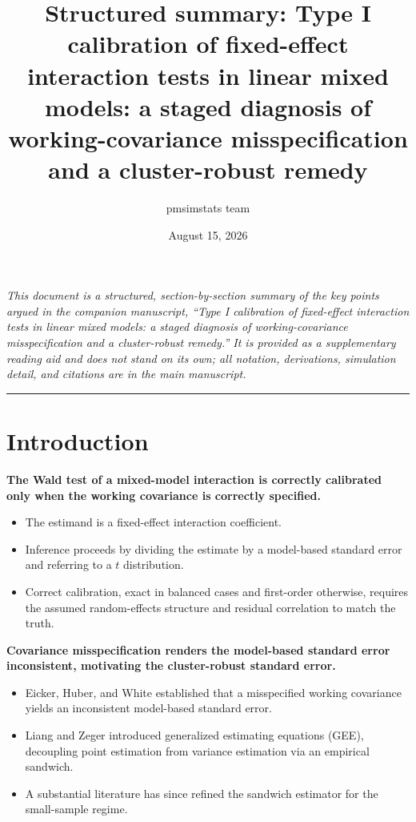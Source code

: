 \documentclass[
  11pt,
]{article}
\title{Structured summary: Type I calibration of fixed-effect interaction tests in linear mixed models: a staged diagnosis of working-covariance misspecification and a cluster-robust remedy}
\author{pmsimstats team}
\date{August 15, 2026}
\begin{document}
\maketitle

{
\setcounter{tocdepth}{2}
\tableofcontents
}
\emph{This document is a structured, section-by-section summary of the key points argued in the companion manuscript, ``Type I calibration of fixed-effect interaction tests in linear mixed models: a staged diagnosis of working-covariance misspecification and a cluster-robust remedy.'' It is provided as a supplementary reading aid and does not stand on its own; all notation, derivations, simulation detail, and citations are in the main manuscript.}

\bigskip\noindent

\rule{\textwidth}{0.4pt}\bigskip

\section{Introduction}\label{introduction}

\textbf{The Wald test of a mixed-model interaction is correctly calibrated only when the working covariance is correctly specified.}

\begin{itemize}\setlength{\itemsep}{2pt}\setlength{\parskip}{0pt}
\item The estimand is a fixed-effect interaction coefficient.
\item Inference proceeds by dividing the estimate by a model-based standard error and referring to a $t$ distribution.
\item Correct calibration, exact in balanced cases and first-order otherwise, requires the assumed random-effects structure and residual correlation to match the truth.
\end{itemize}

\textbf{Covariance misspecification renders the model-based standard error inconsistent, motivating the cluster-robust standard error.}

\begin{itemize}\setlength{\itemsep}{2pt}\setlength{\parskip}{0pt}
\item Eicker, Huber, and White established that a misspecified working covariance yields an inconsistent model-based standard error.
\item Liang and Zeger introduced generalized estimating equations (GEE), decoupling point estimation from variance estimation via an empirical sandwich.
\item A substantial literature has since refined the sandwich estimator for the small-sample regime.
\end{itemize}
\end{document}
